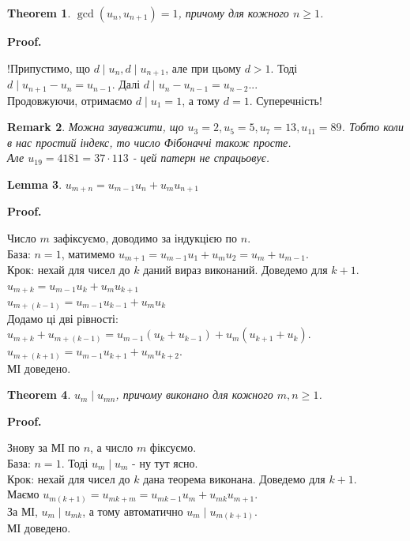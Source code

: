 \documentclass[a4paper, 10pt]{article}
\makeatletter
\theoremstyle{theoremdd}
\newtheorem{theorem}{Theorem}[subsection]
\theoremstyle{theoremdd}
\theoremstyle{theoremdd}
\theoremstyle{theoremdd}
\theoremstyle{theoremdd}
\theoremstyle{theoremdd}
\newtheorem{remark}[theorem]{Remark}
\theoremstyle{theoremdd}
\newtheorem{lemma}[theorem]{Lemma}
\theoremstyle{theoremdd}
\renewenvironment{proof}[1][Proof.\\]{\par
\pushQED{\hfill \qed}%
\normalfont \topsep6\p@\@plus6\p@\relax
\trivlist
\item\relax
{\bfseries
#1\@addpunct{.}}\hspace\labelsep\ignorespaces
}{%
\popQED\endtrivlist\@endpefalse
}
\makeatother
\begin{document}
\begin{theorem}
$\gcd(u_n,u_{n+1}) = 1$, причому для кожного $n \geq 1$.
\end{theorem}

\begin{proof}
!Припустимо, що $d \mid u_n, d \mid u_{n+1}$, але при цьому $d > 1$. Тоді $d \mid u_{n+1}-u_n = u_{n-1}$. Далі $d \mid u_n - u_{n-1} = u_{n-2}$...\\
Продовжуючи, отримаємо $d \mid u_1 = 1$, а тому $d = 1$. Суперечність!
\end{proof}

\begin{remark}
Можна зауважити, що $u_3 = 2, u_5 = 5, u_7 = 13, u_{11} = 89$. Тобто коли в нас простий індекс, то число Фібоначчі також просте.\\
Але $u_{19} = 4181 = 37 \cdot 113$ - цей патерн не спрацьовує.
\end{remark}

\begin{lemma}
$u_{m+n} = u_{m-1}u_n + u_m u_{n+1}$
\end{lemma}

\begin{proof}
Число $m$ зафіксуємо, доводимо за індукцією по $n$.\\
База: $n=1$, матимемо $u_{m+1} = u_{m-1}u_1 + u_m u_2 = u_{m} + u_{m-1}$.\\
Крок: нехай для чисел до $k$ даний вираз виконаний. Доведемо для $k+1$.\\
$u_{m+k} = u_{m-1}u_k + u_m u_{k+1}$\\
$u_{m+(k-1)} = u_{m-1}u_{k-1} + u_mu_k$\\
Додамо ці дві рівності:\\
$u_{m+k}+u_{m+(k-1)} = u_{m-1}(u_k+u_{k-1})+u_m(u_{k+1}+u_k)$.\\
$u_{m+(k+1)} = u_{m-1}u_{k+1} + u_m u_{k+2}$.\\
МІ доведено.
\end{proof}

\begin{theorem}
$u_m \mid u_{mn}$, причому виконано для кожного $m,n \geq 1$.
\end{theorem}

\begin{proof}
Знову за МІ по $n$, а число $m$ фіксуємо.\\
База: $n =1$. Тоді $u_m \mid u_m$ - ну тут ясно.\\
Крок: нехай для чисел до $k$ дана теорема виконана. Доведемо для $k+1$.\\
Маємо $u_{m(k+1)} = u_{mk+m} = u_{mk-1}u_m + u_{mk}u_{m+1}$.\\
За МІ, $u_m \mid u_{mk}$, а тому автоматично $u_m \mid u_{m(k+1)}$.\\
МІ доведено.
\end{proof}
\end{document}
